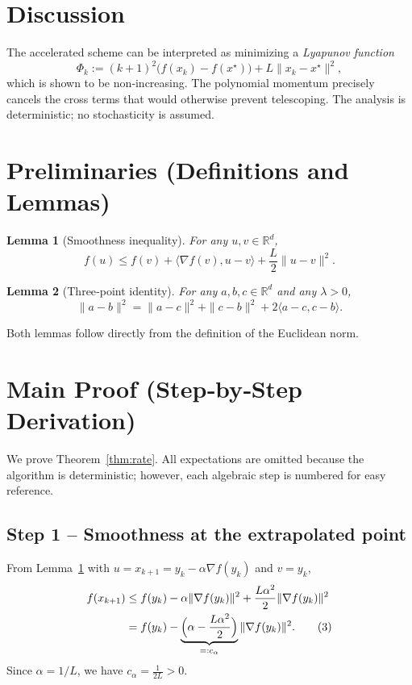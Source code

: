 \documentclass[11pt]{article}
\newtheorem{lemma}{Lemma}
\newcommand{\R}{\mathbb{R}}
\begin{document}
\section*{Discussion}
The accelerated scheme can be interpreted as minimizing a \emph{Lyapunov function}
\[
\Phi_k := (k+1)^{2}\!\bigl(f(x_k)-f(x^{\star})\bigr)+L\|x_k-x^{\star}\|^{2},
\]
which is shown to be non‑increasing. The polynomial momentum precisely cancels the cross terms that would otherwise prevent telescoping. The analysis is deterministic; no stochasticity is assumed.

\newpage
\section*{Preliminaries (Definitions and Lemmas)}
\begin{lemma}[Smoothness inequality]\label{lem:smooth}
For any $u,v\in\R^{d}$,
\[
f(u)\le f(v)+\langle\nabla f(v),u-v\rangle+\frac{L}{2}\|u-v\|^{2}.
\]
\end{lemma}
\begin{lemma}[Three‑point identity]\label{lem:threepoint}
For any $a,b,c\in\R^{d}$ and any $\lambda>0$,
\[
\|a-b\|^{2}= \|a-c\|^{2}+\|c-b\|^{2}+2\langle a-c,c-b\rangle.
\]
\end{lemma}
Both lemmas follow directly from the definition of the Euclidean norm.

\section*{Main Proof (Step‑by‑Step Derivation)}
We prove Theorem~\ref{thm:rate}.  
All expectations are omitted because the algorithm is deterministic; however, each algebraic step is numbered for easy reference.

\subsection*{Step 1 – Smoothness at the extrapolated point}
From Lemma~\ref{lem:smooth} with $u=x_{k+1}=y_k-\alpha\nabla f(y_k)$ and $v=y_k$,
\begin{align}
f(x_{k+1}) &\le f(y_k)-\alpha\|\nabla f(y_k)\|^{2}
               +\frac{L\alpha^{2}}{2}\|\nabla f(y_k)\|^{2} \nonumber\\
           & = f(y_k)-\underbrace{\Bigl(\alpha-\frac{L\alpha^{2}}{2}\Bigr)}_{=:c_{\alpha}}\|\nabla f(y_k)\|^{2}.
\tag{3}
\end{align}
Since $\alpha=1/L$, we have $c_{\alpha}= \frac{1}{2L}>0$.
\end{document}
